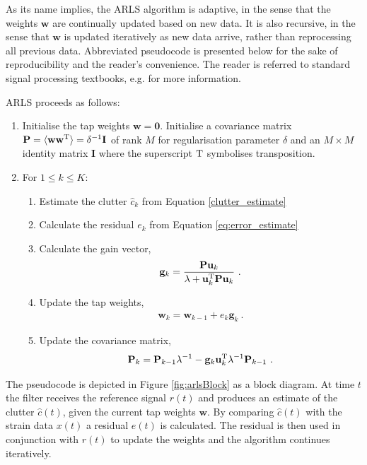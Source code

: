 \documentclass[pra,superscriptaddress,reprint,amsmath,amssymb,nofootinbib]{revtex4-2}
\begin{document}
As its name implies, the ARLS algorithm is adaptive, in the sense that the weights $\mathbf{w}$ are continually updated based on new data. It is also recursive, in the sense that $\mathbf{w}$ is updated iteratively as new data arrive, rather than reprocessing all previous data. Abbreviated pseudocode is presented below for the sake of reproducibility and the reader's convenience. The reader is referred to standard signal processing textbooks, e.g. \cite{HaykinAdaptiveFT:2002} for more information. \newline 

ARLS proceeds as follows:

\begin{enumerate}
	\item Initialise the tap weights $\mathbf{w} = \mathbf{0}$. Initialise a covariance matrix ${\bf P} = \langle {\bf w} {\bf w}^{\rm T} \rangle = \delta^{-1} {\bf I}$ of rank $M$ for regularisation parameter $\delta$ and an $M \times M$ identity matrix $\mathbf{I}$ where the superscript $\rm T$ symbolises transposition.
	\item For $1 \leq k \leq K$:
	\begin{enumerate}
		\item Estimate the clutter $\hat{c}_k$ from Equation \eqref{clutter_estimate}
		\item Calculate the residual $e_k$ from Equation \eqref{eq:error_estimate}
		\item Calculate the gain vector,
		\begin{eqnarray}
			\mathbf{g}_k = \frac{\mathbf{P} \mathbf{u}_k}{\lambda + \mathbf{u}_k^{\rm T}\mathbf{P} \mathbf{u}_k} \ .
		\end{eqnarray}
	\item Update the tap weights,
			\begin{eqnarray}
		\mathbf{w}_k = \mathbf{w}_{k-1} +  e_k \mathbf{g}_k  \ .
	\end{eqnarray}
	\item Update the covariance matrix,
\begin{eqnarray}
	\mathbf{P}_k =  \mathbf{P}_{k-1}  \lambda^{-1}  - \mathbf{g}_k \mathbf{u}_k^{\rm T}  \lambda^{-1} \mathbf{P}_{k-1} \ .
\end{eqnarray}

	\end{enumerate}

\end{enumerate}
The pseudocode is depicted in Figure \ref{fig:arlsBlock} as a block diagram. At time $t$ the filter receives the reference signal $r(t)$ and produces an estimate of the clutter $\hat{c}(t)$, given the current tap weights $\mathbf{w}$. By comparing $\hat{c}(t)$ with the strain data $x(t)$ a residual $e(t)$ is calculated. The residual is then used in conjunction with $r(t)$ to update the weights and the algorithm continues iteratively. \newline 
\end{document}

